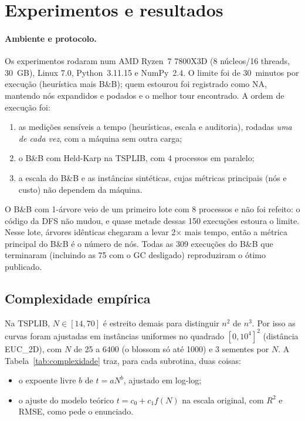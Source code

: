 \section{Experimentos e resultados}\label{sec:exp}

\paragraph{Ambiente e protocolo.} Os experimentos rodaram num AMD Ryzen~7
7800X3D (8 núcleos/16 threads, 30~GB), Linux 7.0, Python~3.11.15 e
NumPy~2.4. O limite foi de 30~minutos por execução (heurística mais B\&B);
quem estourou foi registrado como NA, mantendo nós expandidos e podados e o
melhor tour encontrado. A ordem de execução foi:
\begin{enumerate}
  \item as medições sensíveis a tempo (heurísticas, escala e auditoria),
    rodadas \emph{uma de cada vez}, com a máquina sem outra carga;
  \item o B\&B com Held-Karp na TSPLIB, com 4 processos em paralelo;
  \item a escala do B\&B e as instâncias sintéticas, cujas métricas
    principais (nós e custo) não dependem da máquina.
\end{enumerate}
O B\&B com 1-árvore veio de um primeiro lote com 8 processos e não foi
refeito: o código da DFS não mudou, e quase metade dessas 150 execuções
estoura o limite. Nesse lote, árvores idênticas chegaram a levar
2$\times$ mais tempo, então a métrica principal do B\&B é o número de nós.
Todas as 309 execuções do B\&B que terminaram (incluindo as 75 com o GC
desligado) reproduziram o ótimo publicado.

\subsection{Complexidade empírica}\label{sec:complexidade}

Na TSPLIB, $N\in[14,70]$ é estreito demais para distinguir $n^2$ de $n^3$.
Por isso as curvas foram ajustadas em instâncias uniformes no quadrado
$[0,10^4]^2$ (distância EUC\_2D), com $N$ de 25 a 6400 (o blossom só até
1000) e 3 sementes por $N$. A Tabela~\ref{tab:complexidade} traz, para cada
subrotina, duas coisas:
\begin{itemize}
  \item o expoente livre $b$ de $t=aN^b$, ajustado em log-log;
  \item o ajuste do modelo teórico $t=c_0+c_1f(N)$ na escala original, com
    $R^2$ e RMSE, como pede o enunciado.
\end{itemize}

